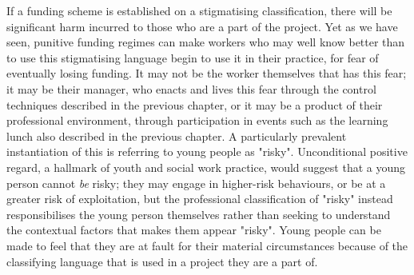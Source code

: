 If a funding scheme is established on a stigmatising classification, there will be significant harm incurred to those who are a part of the project. Yet as we have seen, punitive funding regimes can make workers who may well know better than to use this stigmatising language begin to use it in their practice, for fear of eventually losing funding. It may not be the worker themselves that has this fear; it may be their manager, who enacts and lives this fear through the control techniques described in the previous chapter, or it may be a product of their professional environment, through participation in events such as the learning lunch also described in the previous chapter. A particularly prevalent instantiation of this is referring to young people as "risky". Unconditional positive regard, a hallmark of youth and social work practice, would suggest that a young person cannot \emph{be} risky; they may engage in higher-risk behaviours, or be at a greater risk of exploitation, but the professional classification of "risky" instead responsibilises the young person themselves rather than seeking to understand the contextual factors that makes them appear "risky". Young people can be made to feel that they are at fault for their material circumstances because of the classifying language that is used in a project they are a part of.

